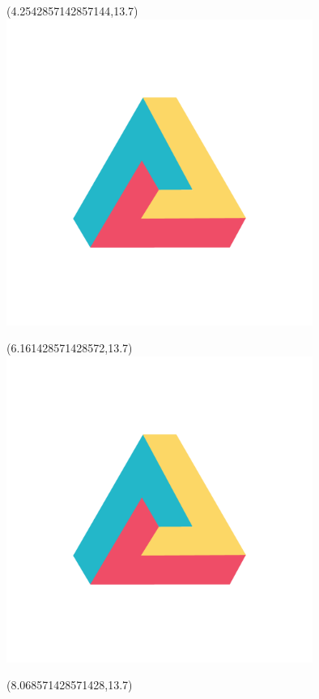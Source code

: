 \documentclass[22pt]{beamer}
\begin{document}
\begin{frame}[fragile]
\begin{textblock}{2}
\end{textblock}
\begin{textblock}{2}(4.2542857142857144,13.7)
\includegraphics[height=10cm]{dh.png} 
\end{textblock}
\begin{textblock}{2}(6.161428571428572,13.7)
\includegraphics[height=10cm]{dh.png} 
\end{textblock}
\begin{textblock}{2}(8.068571428571428,13.7)

\end{textblock}
\end{frame}
\end{document}
